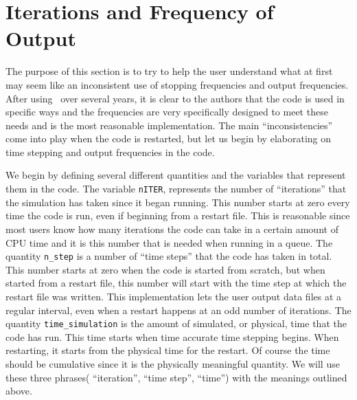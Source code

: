 \section{Iterations and Frequency of Output \label{section:frequency}}

The purpose of this section is to try to help the user understand what at
first may seem like an inconsistent use of stopping frequencies and output
frequencies.  After using \BATSRUS\ over several years, it is clear to the
authors that the code is used in specific ways and the frequencies are
very specifically designed to meet these needs and is the 
most reasonable implementation. The main ``inconsistencies''
come into play when the code is restarted, but let us begin by 
elaborating on time stepping and output frequencies in the code.

We begin by defining several different quantities and the variables that 
represent them in the code.  The variable {\tt nITER}, represents the number
of ``iterations'' that the simulation has taken since it began running.  
This number starts at zero every time the code is run, even if beginning 
from a restart file.
This is reasonable since most users know how many iterations the code can take
in a certain amount of CPU time and it is this number that is needed when 
running in a queue.
The quantity {\tt n\_step} is a number of ``time steps'' that the code has 
taken in total.  This number starts at zero when the code is started from 
scratch, but when started from a restart file, this
number will start with the time step at which the restart file was written.
This implementation lets the user output data files at a regular interval, even
when a restart happens at an odd number of iterations.
The quantity {\tt time\_simulation} is the amount of simulated, or physical, 
time that the code has run.  
This time starts when time accurate time stepping begins.
When restarting, it starts from the physical time for the restart.
Of course the time should be cumulative since it is the physically meaningful
quantity.  We will 
use these three phrases( ``iteration'', ``time step'', ``time'') 
with the meanings outlined above.

